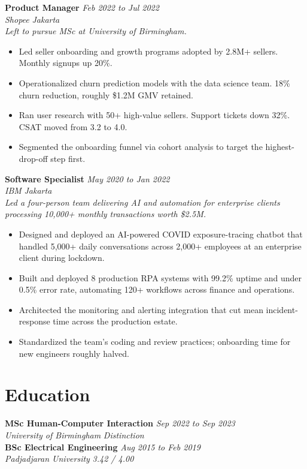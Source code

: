 \documentclass[11pt,a4paper]{article}
\begin{document}
\noindent\textbf{Product Manager} \hfill \textit{Feb 2022 to Jul 2022}\\
\textit{Shopee} \hfill \textit{Jakarta}\\
\small\emph{Left to pursue MSc at University of Birmingham.}\normalsize
\begin{itemize}
  \item Led seller onboarding and growth programs adopted by 2.8M+ sellers. Monthly signups up 20\%.
  \item Operationalized churn prediction models with the data science team. 18\% churn reduction, roughly \$1.2M GMV retained.
  \item Ran user research with 50+ high-value sellers. Support tickets down 32\%. CSAT moved from 3.2 to 4.0.
  \item Segmented the onboarding funnel via cohort analysis to target the highest-drop-off step first.
\end{itemize}

\noindent\textbf{Software Specialist} \hfill \textit{May 2020 to Jan 2022}\\
\textit{IBM} \hfill \textit{Jakarta}\\
\small\emph{Led a four-person team delivering AI and automation for enterprise clients processing 10{,}000+ monthly transactions worth \$2.5M.}\normalsize
\begin{itemize}
  \item Designed and deployed an AI-powered COVID exposure-tracing chatbot that handled 5{,}000+ daily conversations across 2{,}000+ employees at an enterprise client during lockdown.
  \item Built and deployed 8 production RPA systems with 99.2\% uptime and under 0.5\% error rate, automating 120+ workflows across finance and operations.
  \item Architected the monitoring and alerting integration that cut mean incident-response time across the production estate.
  \item Standardized the team's coding and review practices; onboarding time for new engineers roughly halved.
\end{itemize}

\section*{Education}

\noindent\textbf{MSc Human-Computer Interaction} \hfill \textit{Sep 2022 to Sep 2023}\\
\textit{University of Birmingham} \hfill \textit{Distinction}\\[0.4em]
\textbf{BSc Electrical Engineering} \hfill \textit{Aug 2015 to Feb 2019}\\
\textit{Padjadjaran University} \hfill \textit{3.42 / 4.00}
\end{document}
